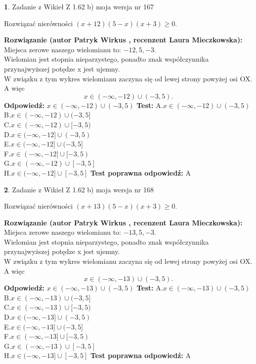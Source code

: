 \documentclass[12pt, a4paper]{article}
\theoremstyle{definition} %
\newtheorem{zad}{}
\newcommand{\zadStart}[1]{\begin{zad}#1\newline}
\newcommand{\zadStop}{\end{zad}}
\newcommand{\rozwStart}[2]{\noindent \textbf{Rozwiązanie (autor #1 , recenzent #2): }\newline}
\newcommand{\rozwStop}{\newline}
\newcommand{\odpStart}{\noindent \textbf{Odpowiedź:}\newline}
\newcommand{\odpStop}{\newline}
\newcommand{\testStart}{\noindent \textbf{Test:}\newline}
\newcommand{\testStop}{\newline}
\newcommand{\kluczStart}{\noindent \textbf{Test poprawna odpowiedź:}\newline}
\newcommand{\kluczStop}{\newline}
\begin{document}
\zadStart{Zadanie z Wikieł Z 1.62 b) moja wersja nr 167}

Rozwiązać nierówności $(x+12)(5-x)(x+3)\ge0$.
\zadStop
\rozwStart{Patryk Wirkus}{Laura Mieczkowska}
Miejsca zerowe naszego wielomianu to: $-12, 5, -3$.\\
Wielomian jest stopnia nieparzystego, ponadto znak współczynnika przy\linebreak najwyższej potędze x jest ujemny.\\ W związku z tym wykres wielomianu zaczyna się od lewej strony powyżej osi OX. A więc $$x \in (-\infty,-12) \cup (-3,5).$$
\rozwStop
\odpStart
$x \in (-\infty,-12) \cup (-3,5)$
\odpStop
\testStart
A.$x \in (-\infty,-12) \cup (-3,5)$\\
B.$x \in (-\infty,-12) \cup (-3,5]$\\
C.$x \in (-\infty,-12) \cup [-3,5)$\\
D.$x \in (-\infty,-12] \cup (-3,5)$\\
E.$x \in (-\infty,-12] \cup (-3,5]$\\
F.$x \in (-\infty,-12] \cup [-3,5)$\\
G.$x \in (-\infty,-12) \cup [-3,5]$\\
H.$x \in (-\infty,-12] \cup [-3,5]$
\testStop
\kluczStart
A
\kluczStop



\zadStart{Zadanie z Wikieł Z 1.62 b) moja wersja nr 168}

Rozwiązać nierówności $(x+13)(5-x)(x+3)\ge0$.
\zadStop
\rozwStart{Patryk Wirkus}{Laura Mieczkowska}
Miejsca zerowe naszego wielomianu to: $-13, 5, -3$.\\
Wielomian jest stopnia nieparzystego, ponadto znak współczynnika przy\linebreak najwyższej potędze x jest ujemny.\\ W związku z tym wykres wielomianu zaczyna się od lewej strony powyżej osi OX. A więc $$x \in (-\infty,-13) \cup (-3,5).$$
\rozwStop
\odpStart
$x \in (-\infty,-13) \cup (-3,5)$
\odpStop
\testStart
A.$x \in (-\infty,-13) \cup (-3,5)$\\
B.$x \in (-\infty,-13) \cup (-3,5]$\\
C.$x \in (-\infty,-13) \cup [-3,5)$\\
D.$x \in (-\infty,-13] \cup (-3,5)$\\
E.$x \in (-\infty,-13] \cup (-3,5]$\\
F.$x \in (-\infty,-13] \cup [-3,5)$\\
G.$x \in (-\infty,-13) \cup [-3,5]$\\
H.$x \in (-\infty,-13] \cup [-3,5]$
\testStop
\kluczStart
A
\kluczStop
\end{document}
